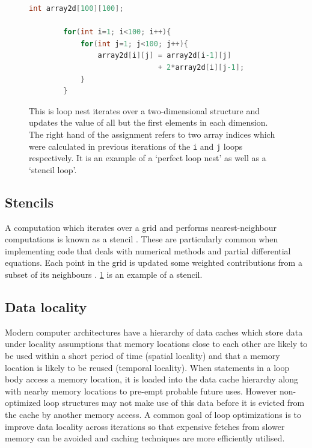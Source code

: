 \documentclass[a4paper,12pt,twoside]{report}
\begin{document}
\begin{figure}[h]
    \begin{lstlisting}[language=C]
        int array2d[100][100];

        for(int i=1; i<100; i++){
            for(int j=1; j<100; j++){
                array2d[i][j] = array2d[i-1][j] 
                              + 2*array2d[i][j-1];
            }
        }
    \end{lstlisting}
    \caption{
        This is loop nest iterates over a two-dimensional structure and updates the value of all but the first elements in each dimension.
        The right hand of the assignment refers to two array indices which were calculated in previous iterations of the \texttt{i} and \texttt{j} loops
        respectively. It is an example of a `perfect loop nest' as well as a `stencil loop'.
    }
    \label{fig:stencil}
\end{figure}

\subsection{Stencils}
A computation which iterates over a grid and performs nearest-neighbour computations is known as a stencil . These are
particularly common when implementing code that deals with numerical methods and partial differential equations.
Each point in the grid is updated some weighted contributions from a subset of its neighbours \cite{stencil}. \ref{fig:stencil} is an example of a stencil.

\subsection{Data locality}
Modern computer architectures have a hierarchy of data caches which store data under locality assumptions that memory locations close to each other
are likely to be used within a short period of time (spatial locality) and that a memory location is likely to be reused (temporal locality). 
When statements in a loop body access a memory location, it is loaded into the data cache hierarchy along with nearby memory locations to pre-empt probable future uses.
However non-optimized loop structures may not make use of this data before it is evicted from the cache by another memory access.
A common goal of loop optimizations is to improve data locality across iterations so that expensive fetches from slower memory can be avoided 
and caching techniques are more efficiently utilised.
\end{document}
